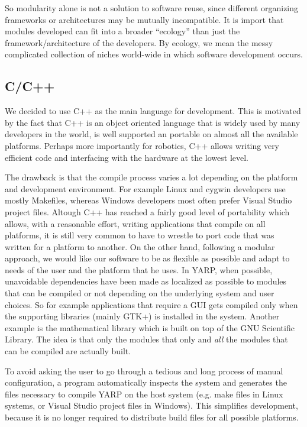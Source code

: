 So modularity alone is not a solution to software reuse, since 
different organizing frameworks or architectures may be mutually
incompatible.  It is import that modules developed can fit
into a broader ``ecology'' than just the framework/architecture
of the developers.  By ecology, we mean the messy complicated
collection of niches world-wide in which software development occurs.






\subsection{C/C++}

We decided to use C++ as the main language for development. This 
is motivated by the fact that C++ is an object oriented language
that is widely used by many developers in the world, is well 
supported an portable on almost all the available platforms. 
Perhaps more importantly for robotics, C++ allows writing very 
efficient code and interfacing with the hardware at the lowest 
level. 

The drawback is that the compile process varies a lot depending 
on the platform and development environment. For example Linux 
and cygwin developers use mostly Makefiles, whereas Windows 
developers most often prefer Visual Studio project files. 
Altough C++ has reached a fairly good level 
of portability which allows, with a reasonable effort, writing 
applications that compile on all platforms, it is still very 
common to have to wrestle to port code that was written for 
a platform to another. On the other hand, following a 
modular approach, we would like our software to be as flexible 
as possible and adapt to needs of the user and the platform that 
he uses. In YARP, when possible, unavoidable dependencies 
have been made as localized as possible to modules that can be 
compiled or not depending on the underlying system and user 
choices. So for example applications that require a GUI gets 
compiled only when the supporting libraries (mainly GTK+) 
is installed in the system. Another example is the mathematical
library which is built on top of the GNU Scientific Library. 
The idea is that only the modules that only and \emph{all} the 
modules that can be compiled are actually built.

To avoid asking the user to go through a tedious and long process 
of manual configuration, a program automatically inspects the 
system and generates the files necessary to compile YARP 
on the host system (e.g. make files in Linux systems, or Visual 
Studio project files in Windows). This simplifies development, 
because it is no longer required to distribute build files 
for all possible platforms.

